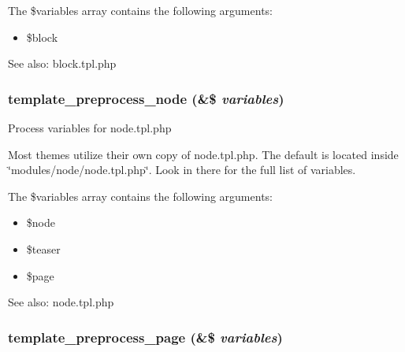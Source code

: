 The \$variables array contains the following arguments:\begin{itemize}
\item \$block\end{itemize}


\begin{Desc}
\item[See also:]block.tpl.php \end{Desc}
\hypertarget{includes_2theme_8inc_bba818ede4c18fb7d92f0a5d5f1aa771}{
\subsubsection[{template\_\-preprocess\_\-node}]{\setlength{\rightskip}{0pt plus 5cm}template\_\-preprocess\_\-node (\&\$ {\em variables})}}
\label{includes_2theme_8inc_bba818ede4c18fb7d92f0a5d5f1aa771}


Process variables for node.tpl.php

Most themes utilize their own copy of node.tpl.php. The default is located inside \char`\"{}modules/node/node.tpl.php\char`\"{}. Look in there for the full list of variables.

The \$variables array contains the following arguments:\begin{itemize}
\item \$node\item \$teaser\item \$page\end{itemize}


\begin{Desc}
\item[See also:]node.tpl.php \end{Desc}
\hypertarget{includes_2theme_8inc_128dae24f990d8ba4710ac78b0584c11}{
\subsubsection[{template\_\-preprocess\_\-page}]{\setlength{\rightskip}{0pt plus 5cm}template\_\-preprocess\_\-page (\&\$ {\em variables})}}
\label{includes_2theme_8inc_128dae24f990d8ba4710ac78b0584c11}


